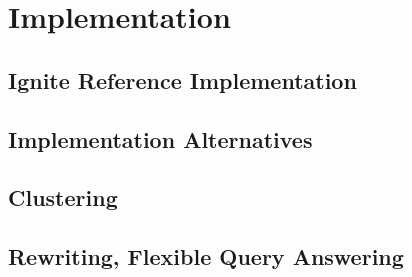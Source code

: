
\section{Implementation}
\label{sec:impl}


\subsection{Ignite Reference Implementation}

\subsection{Implementation Alternatives}

\subsection{Clustering}

\subsection{Rewriting, Flexible Query Answering}